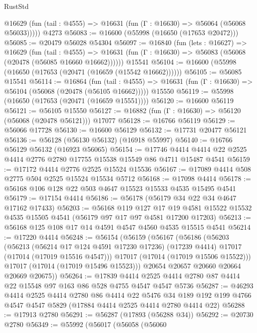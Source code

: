 \begin{lexlean}{RustStd}
\begin{coremodule}
{\begin{coremodule}
{{{{{{{{{{{{{{{{{{{{{{{{{{{{{{{{{{{{{{{{{{{{{{{{{{{{{{{      @16629 (fun (tail : @4555) => @16631 (fun (Γ : @16630) => @56064 (@56068 @56033)))))
    @4273
@56083 := @16600 (@55998 (@16650 (@17653 @20472)))
@56085 := @20479 @56028 @54304
@56097 := @16840
    (fun (lets : @16627) =>
    @16629
      (fun (tail : @4555) =>
      @16631 (fun (Γ : @16630) => @56083 (@56068 (@20478 (@56085 @16660 @16662))))))
    @15541
@56104 := @16600 (@55998 (@16650 (@17653 (@20471 (@16659 (@15542 @16662))))))
@56105 := @56085 @15541
@56114 := @16864
    (fun (tail : @4555) => @16631 (fun (Γ : @16630) => @56104 (@56068 (@20478 (@56105 @16662)))))
    @15550
@56119 := @55998 (@16650 (@17653 (@20471 (@16659 @15551))))
@56120 := @16600 @56119
@56121 := @56105 @15550
@56127 := @16882 (fun (Γ : @16630) => @56120 (@56068 (@20478 @56121))) @17077
@56128 := @16766 @56119
@56129 := @56066 @17728
@56130 := @16600 @56129
@56132 := @17731 @20477 @56121
@56136 := @56128 (@56130 @56132) (@16918 @55997)
@56140 := @16766 @56129 @56132 (@16923 @56065)
@56154 := @17746 @4414 @4414 @22 @2525 @4414 @2776 @2780 @17755 @15538 @15549 @86 @4711 @15487 @4541
@56159 := @17172 @4414 @2776 @2525 @15524 @15536
@56167 := @17089 @4414 @508 @2775 @504 @2525 @15524 @15534 @5712
@56168 := @17098 @4414
@56178 := @56168 @106 @128 @22 @503 @4647 @15523 @15533 @4535 @15495 @4541
@56179 := @17154 @4414
@56186 := @56178 (@56179 @34 @22 @34 @4647 @17162 @17433)
@56203 := @56168
    @119
    @127
    @17
    @19
    @4581
    @15522
    @15532
    @4535
    @15505
    @4541
    (@56179 @97 @17 @97 @4581 @17200 @17203)
@56213 := @56168 @125 @108 @17 @14 @4591 @4547 @4560 @4535 @15515 @4541
@56214 := @17220 @4414
@56248 := @56154
    (@56159
      (@56167
        (@56186
          (@56203
            (@56213
              (@56214 @17 @124 @4591 @17230 @17236)
              (@17239 @4414)
              @17017
              (@17014 (@17019 @15516 @4547)))
            @17017
            (@17014 (@17019 @15506 @15522)))
          @17017
          (@17014 (@17019 @15496 @15523)))
        @20654
        @20657
        @20660
        @20664
        @20669
        @20675))
@56264 := @17839
    @4414
    @2525
    @4414
    @2780
    @87
    @4414
    @22
    @15548
    @97
    @163
    @86
    @528
    @4755
    @4547
    @4547
    @5736
@56287 := @46293
    @4414
    @2525
    @4414
    @2780
    @86
    @4414
    @22
    @5476
    @34
    @189
    @192
    @199
    @4766
    @4547
    @4547
    @5829
    (@17884 @4414 @2525 @4414 @2780 @4414 @22)
@56288 := @17913 @2780
@56291 := @56287 (@17893 (@56288 @34))
@56292 := @20730 @2780
@56349 := @55992
    (@56017
      (@56058
        (@56060
}}}}}}}}}}}}}}}}}}}}}}}}}}}}}}}}}}}}}}}}}}}}}}}}}}}}}}}
\end{coremodule}}
\end{coremodule}
\end{lexlean}
